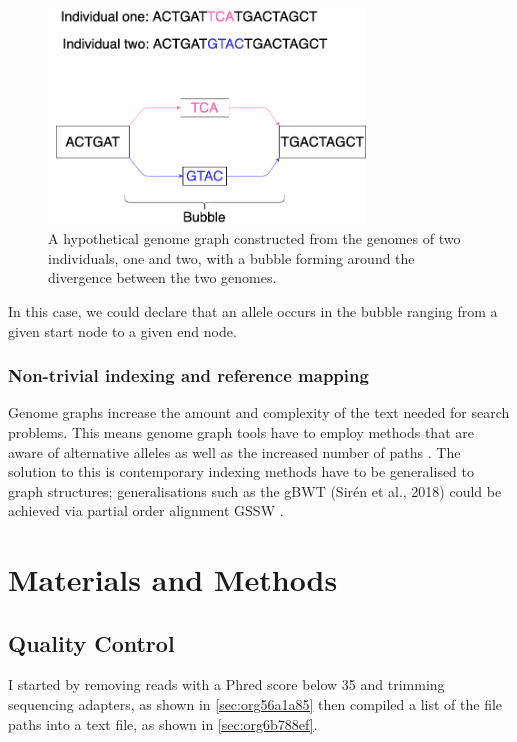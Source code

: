 \documentclass[10pt, a4paper]{article}
\begin{document}
\begin{figure}[h]
\centering
\includegraphics[width=0.75\textwidth]{../Figures/bubble.png}
\caption[A bubble in a graph]{\label{fig:org3cfcfbe}A hypothetical genome graph constructed from the genomes of two individuals, one and two, with a bubble forming around the divergence between the two genomes.}
\end{figure}

In this case, we could declare that an allele occurs in the bubble ranging from
a given start node to a given end node.

\subsubsection{Non-trivial indexing and reference mapping}
\label{sec:orgbe517a7}
Genome graphs increase the amount and complexity of the text needed for search
problems. 
This means genome graph tools have to employ methods that are aware of 
alternative alleles as well as the increased number of paths 
\cite{patenGenomeGraphsEvolution2017}. 
The solution to this is contemporary indexing methods have to be generalised to 
graph structures; generalisations such as the gBWT (Sirén et al., 2018) could
 be achieved via partial order alignment GSSW \cite{zhaoSSWLibrarySIMD2013}.

\newpage
\section{Materials and Methods}
\label{sec:org58f0963}
\subsection{Quality Control}
\label{sec:orgdaa50f7}
I started by removing reads with a Phred score below 35 and trimming sequencing
adapters, as shown in \ref{sec:org56a1a85} then compiled a list
of the file paths into a text file, as shown in
\ref{sec:org6b788ef}.
\end{document}

